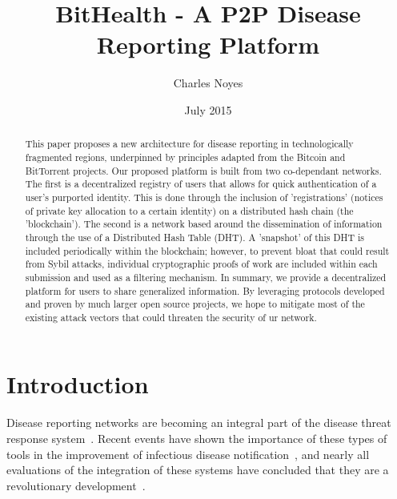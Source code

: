 \documentclass{article}
\title{BitHealth - A P2P Disease Reporting Platform}
\author{Charles Noyes}
\date{July 2015}
\begin{document}
\maketitle

\begin{abstract}
This paper proposes a new architecture for disease reporting in technologically fragmented regions, underpinned by principles adapted from the Bitcoin and BitTorrent projects. Our proposed platform is built from two co-dependant networks. The first is a decentralized registry of users that allows for quick authentication of a user's purported identity. This is done through the inclusion of 'registrations' (notices of private key allocation to a certain identity) on a distributed hash chain (the 'blockchain'). The second is a network based around the dissemination of information through the use of a Distributed Hash Table (DHT). A 'snapshot' of this DHT is included periodically within the blockchain; however, to prevent bloat that could result from Sybil attacks, individual cryptographic proofs of work are included within each submission and used as a filtering mechanism. In summary, we provide a decentralized platform for users to share generalized information. By leveraging protocols developed and proven by much larger open source projects, we hope to mitigate most of the existing attack vectors that could threaten the security of ur network.
\end{abstract}


\maketitle

\section{Introduction}
Disease reporting networks are becoming an integral part of the disease threat response system~\cite{Heymann:1998tyba}. Recent events have shown the importance of these types of tools in the improvement of infectious disease notification~\cite{Ward:2005vk}, and nearly all evaluations of the integration of these systems have concluded that they are a revolutionary development~\cite{Jajosky:2004ty,Lazarus:2009wz,Overhage:2001vq}.

\printbibliography
\end{document}
